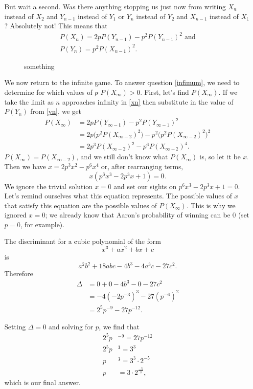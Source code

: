 \documentclass{book}
\begin{document}
But wait a second. Was there anything stopping us just now from writing $X_n$ instead of $X_2$ and $Y_{n-1}$ instead of $Y_1$ or $Y_n$ instead of $Y_2$ and $X_{n-1}$ instead of $X_1$? Absolutely not! This means that
\begin{gather}
P(X_n) = 2pP(Y_{n-1}) - p^2P(Y_{n-1})^2\text{ and}\label{xn}\\
P(Y_n) = p^2P(X_{n-1})^2.\label{yn}
\end{gather}

\begin{figure}[ht]
\centering
{}
\caption{something}
\end{figure}

We now return to the infinite game. To answer question \ref{infimum}, we need to determine for which values of $p$ $P(X_\infty) > 0$. First, let's find $P(X_\infty)$. If we take the limit as $n$ approaches infinity in \eqref{xn} then substitute in the value of $P(Y_n)$ from \eqref{yn}, we get
\begin{align*}
P(X_\infty) &= 2pP(Y_{\infty-1}) - p^2P(Y_{\infty-1})^2\\
&= 2p\Big(p^2P(X_{\infty-2})^2\Big) - p^2\Big(p^2P(X_{\infty-2})^2\Big)^2\\
&= 2p^3P(X_{\infty-2})^2 - p^6P(X_{\infty-2})^4.
\end{align*}
$P(X_\infty) = P(X_{\infty-2})$, and we still don't know what $P(X_\infty)$ is, so let it be $x$. Then we have $x = 2p^3x^2 - p^6x^4$ or, after rearranging terms,
\begin{equation*}
x(p^6x^3 - 2p^3x + 1) = 0.
\end{equation*}
We ignore the trivial solution $x = 0$ and set our sights on $p^6x^3 - 2p^3x + 1 = 0$. Let's remind ourselves what this equation represents. The possible values of $x$ that satisfy this equation are the possible values of $P(X_\infty)$. This is why we ignored $x=0$; we already know that Aaron's probability of winning can be $0$ (set $p = 0$, for example). 

The discriminant for a cubic polynomial of the form \[x^3 + ax^2 + bx + c\] is \[a^2b^2 + 18abc - 4b^3 - 4a^3c - 27c^2.\] Therefore
\begin{align*}
\Delta &= 0 + 0 -4b^3 - 0 - 27c^2\\
&=-4(-2p^{-3})^3 - 27(p^{-6})^2\\
&=2^5p^{-9} - 27p^{-12}.
\end{align*}

Setting $\Delta = 0$ and solving for $p$, we find that
\begin{align*}
2^5p&^{-9} = 27p^{-12}\\
2^5p&^3 = 3^3\\
p&^3 = 3^3\cdot 2^{-5}\\
p& = 3\cdot 2^{\frac{-5}{3}},
\end{align*}
which is our final answer.
\end{document}
